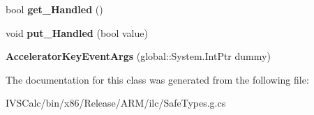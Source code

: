 \begin{DoxyCompactItemize}
bool {\bfseries get\+\_\+\+Handled} ()
\item 
\mbox{\label{class_windows_1_1_u_i_1_1_core_1_1_accelerator_key_event_args_a3d9c66a182b0cf5b679a3869603c5907}} 
void {\bfseries put\+\_\+\+Handled} (bool value)
\item 
\mbox{\label{class_windows_1_1_u_i_1_1_core_1_1_accelerator_key_event_args_af50432bf9a9aaebc40975f48537de074}} 
{\bfseries Accelerator\+Key\+Event\+Args} (global\+::\+System.\+Int\+Ptr dummy)
\end{DoxyCompactItemize}


The documentation for this class was generated from the following file\+:\begin{DoxyCompactItemize}
\item 
I\+V\+S\+Calc/bin/x86/\+Release/\+A\+R\+M/ilc/Safe\+Types.\+g.\+cs\end{DoxyCompactItemize}
